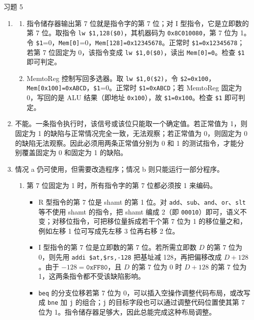 \begin{problem}
    习题 5
    \begin{solution}
        \begin{enumerate}
            \item[\textbf{1)}] 
            \begin{enumerate}
                \item[\textbf{a)}] 指令储存器输出第 7 位就是指令字的第 7 位；对 I 型指令，它是立即数的第 7 位。取指令 \texttt{lw \$1,128(\$0)}，其机器码为 \texttt{0x8C010080}，第 7 位为 1。令 \texttt{\$1}=0，\texttt{Mem[0]}=0，\texttt{Mem[128]=0x12345678}。正常时 \texttt{\$1=0x12345678}；若第 7 位固定为 0，该指令变成 \texttt{lw \$1,0(\$0)}，读出 \texttt{Mem[0]=0}。检查 \texttt{\$1} 即可判定。
                
                \item[\textbf{b)}] MemtoReg 控制写回多选器。取 \texttt{lw \$1,0(\$2)}，令 \texttt{\$2=0x100}，\texttt{Mem[0x100]=0xABCD}，\texttt{\$1}=0。正常时 \texttt{\$1=0xABCD}；若 MemtoReg 固定为 0，写回的是 ALU 结果（即地址 \texttt{0x100}），故 \texttt{\$1=0x100}。检查 \texttt{\$1} 即可判定。
            \end{enumerate}

            \item[\textbf{2)}] 不能。一条指令执行时，该信号或该位只能取一个确定值。若正常值为 1，则固定为 1 的缺陷与正常情况完全一致，无法观察；若正常值为 0，则固定为 0 的缺陷无法观察。因此必须用两条正常值分别为 0 和 1 的测试指令，才能分别覆盖固定为 0 和固定为 1 的缺陷。

            \item[\textbf{3)}] 情况 a 仍可使用，但需要改造程序；情况 b 则只能运行一部分程序。
            \begin{enumerate}
                \item[\textbf{a)}] 第 7 位固定为 1 时，所有指令字的第 7 位都必须按 1 来编码。
                \begin{itemize}
                    \item R 型指令的第 7 位是 shamt 的第 1 位。对 \texttt{add}、\texttt{sub}、\texttt{and}、\texttt{or}、\texttt{slt} 等不使用 shamt 的指令，把 shamt 编成 2（即 \texttt{00010}）即可，语义不变；对移位指令，可把移位量拆成若干个第 7 位为 1 的移位量之和，例如左移 1 位可写成先左移 3 位再右移 2 位。
                    \item I 型指令的第 7 位是立即数的第 7 位。若所需立即数 $D$ 的第 7 位为 0，则先用 \texttt{addi \$at,\$rs,-128} 把基址减 128，再把偏移改成 $D+128$。由于 $-128=\texttt{0xFF80}$，且 $D$ 的第 7 位为 0 时 $D+128$ 的第 7 位为 1，这两条指令都不受该缺陷影响。
                    \item \texttt{beq} 的分支位移若第 7 位为 0，可以插入空操作调整代码布局，或改写成 \texttt{bne} 加 \texttt{j} 的组合；\texttt{j} 的目标字段也可以通过调整代码位置使其第 7 位为 1。指令储存器足够大，因此总能完成这种布局调整。
                \end{itemize}


\end{enumerate}
\end{enumerate}
\end{solution}
\end{problem}
